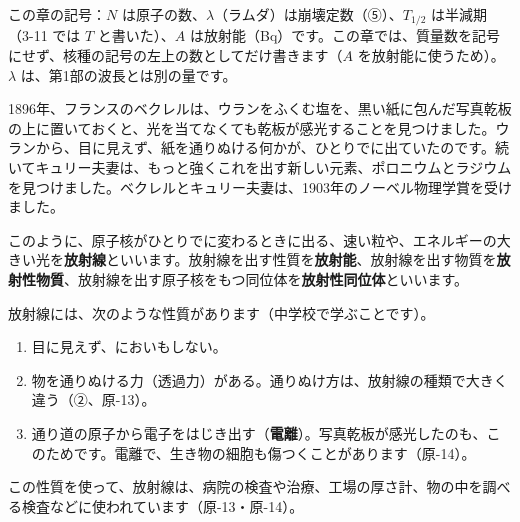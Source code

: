 \begin{omoidasou}
\end{omoidasou}

\noindent この章の記号：$N$ は原子の数、$\lambda$（ラムダ）は崩壊定数（⑤）、$T_{1/2}$ は半減期（3-11 では $T$ と書いた）、$A$ は放射能（Bq）です。この章では、質量数を記号にせず、核種の記号の左上の数としてだけ書きます（$A$ を放射能に使うため）。$\lambda$ は、第1部の波長とは別の量です。



\label{ph:原-12:sec1}
1896年、フランスのベクレルは、ウランをふくむ塩を、黒い紙に包んだ写真乾板の上に置いておくと、光を当てなくても乾板が感光することを見つけました。ウランから、目に見えず、紙を通りぬける何かが、ひとりでに出ていたのです。続いてキュリー夫妻は、もっと強くこれを出す新しい元素、ポロニウムとラジウムを見つけました。ベクレルとキュリー夫妻は、1903年のノーベル物理学賞を受けました。

このように、原子核がひとりでに変わるときに出る、速い粒や、エネルギーの大きい光を\textbf{放射線}といいます。放射線を出す性質を\textbf{放射能}、放射線を出す物質を\textbf{放射性物質}、放射線を出す原子核をもつ同位体を\textbf{放射性同位体}といいます。

放射線には、次のような性質があります（中学校で学ぶことです）。
\begin{enumerate}[label={\bkcircled{\arabic*}}, leftmargin=2.4\zw, itemsep=1pt, topsep=2pt]
\item 目に見えず、においもしない。
\item 物を通りぬける力（透過力）がある。通りぬけ方は、放射線の種類で大きく違う（②、原-13）。
\item 通り道の原子から電子をはじき出す（\textbf{電離}）。写真乾板が感光したのも、このためです。電離で、生き物の細胞も傷つくことがあります（原-14）。
\end{enumerate}
この性質を使って、放射線は、病院の検査や治療、工場の厚さ計、物の中を調べる検査などに使われています（原-13・原-14）。

